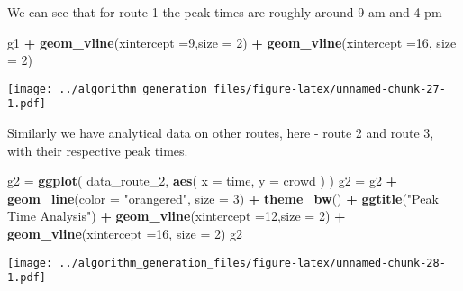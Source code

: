 \documentclass[
]{article}
\newenvironment{Shaded}{\begin{snugshade}}{\end{snugshade}}
\newcommand{\DataTypeTok}[1]{\textcolor[rgb]{0.13,0.29,0.53}{#1}}
\newcommand{\DecValTok}[1]{\textcolor[rgb]{0.00,0.00,0.81}{#1}}
\newcommand{\KeywordTok}[1]{\textcolor[rgb]{0.13,0.29,0.53}{\textbf{#1}}}
\newcommand{\NormalTok}[1]{#1}
\newcommand{\OperatorTok}[1]{\textcolor[rgb]{0.81,0.36,0.00}{\textbf{#1}}}
\newcommand{\StringTok}[1]{\textcolor[rgb]{0.31,0.60,0.02}{#1}}
\begin{document}
We can see that for route 1 the peak times are roughly around 9 am and 4
pm

\begin{Shaded}
\begin{Highlighting}[]
\NormalTok{g1 }\OperatorTok{+}\StringTok{ }\KeywordTok{geom_vline}\NormalTok{(}\DataTypeTok{xintercept =}\DecValTok{9}\NormalTok{,}\DataTypeTok{size =} \DecValTok{2}\NormalTok{) }\OperatorTok{+}\StringTok{ }\KeywordTok{geom_vline}\NormalTok{(}\DataTypeTok{xintercept =}\DecValTok{16}\NormalTok{, }\DataTypeTok{size =} \DecValTok{2}\NormalTok{) }
\end{Highlighting}
\end{Shaded}

\texttt{[image: ../algorithm\_generation\_files/figure-latex/unnamed-chunk-27-1.pdf]}

Similarly we have analytical data on other routes, here - route 2 and
route 3, with their respective peak times.

\begin{Shaded}
\begin{Highlighting}[]
\NormalTok{g2 =}\StringTok{ }\KeywordTok{ggplot}\NormalTok{(}
\NormalTok{  data_route_}\DecValTok{2}\NormalTok{,}
      \KeywordTok{aes}\NormalTok{(}
        \DataTypeTok{x =}\NormalTok{ time,}
        \DataTypeTok{y =}\NormalTok{ crowd}
\NormalTok{      )}
\NormalTok{) }
\NormalTok{g2 =}\StringTok{ }\NormalTok{g2 }\OperatorTok{+}\StringTok{ }\KeywordTok{geom_line}\NormalTok{(}\DataTypeTok{color =} \StringTok{"orangered"}\NormalTok{, }\DataTypeTok{size =} \DecValTok{3}\NormalTok{) }\OperatorTok{+}\StringTok{ }\KeywordTok{theme_bw}\NormalTok{() }\OperatorTok{+}\StringTok{ }\KeywordTok{ggtitle}\NormalTok{(}\StringTok{"Peak Time Analysis"}\NormalTok{) }\OperatorTok{+}\StringTok{ }\KeywordTok{geom_vline}\NormalTok{(}\DataTypeTok{xintercept =}\DecValTok{12}\NormalTok{,}\DataTypeTok{size =} \DecValTok{2}\NormalTok{) }\OperatorTok{+}\StringTok{ }\KeywordTok{geom_vline}\NormalTok{(}\DataTypeTok{xintercept =}\DecValTok{16}\NormalTok{, }\DataTypeTok{size =} \DecValTok{2}\NormalTok{) }
\NormalTok{g2}
\end{Highlighting}
\end{Shaded}

\texttt{[image: ../algorithm\_generation\_files/figure-latex/unnamed-chunk-28-1.pdf]}
\end{document}
